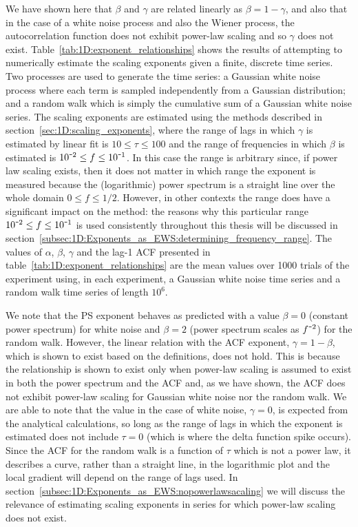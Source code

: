 {{We have shown here that $\beta$ and $\gamma$ are related linearly as $\beta = 1-\gamma$, and also that in the case of a white noise process and also the Wiener process, the autocorrelation function does not exhibit power-law scaling and so $\gamma$ does not exist. Table~\ref{tab:1D:exponent_relationships} shows the results of attempting to numerically estimate the scaling exponents given a finite, discrete time series. Two processes are used to generate the time series: a Gaussian white noise process where each term is sampled independently from a Gaussian distribution; and a random walk which is simply the cumulative sum of a Gaussian white noise series. The scaling exponents are estimated using the methods described in section~\ref{sec:1D:scaling_exponents}, where the range of lags in which $\gamma$ is estimated by linear fit is $10\leq\tau\leq100$ and the range of frequencies in which $\beta$ is estimated is $10^{\textup{\texttt{-}}2}\leq f \leq 10^{\textup{\texttt{-}}1}$. In this case the range is arbitrary since, if power law scaling exists, then it does not matter in which range the exponent is measured because the (logarithmic) power spectrum is a straight line over the whole domain $0\leq f \leq 1/2$. However, in other contexts the range does have a significant impact on the method: the reasons why this particular range $10^{\textup{\texttt{-}}2}\leq f \leq 10^{\textup{\texttt{-}}1}$ is used consistently throughout this thesis will be discussed in section~\ref{subsec:1D:Exponents_as_EWS:determining_frequency_range}. The values of $\alpha$, $\beta$, $\gamma$ and the lag-1 ACF presented in table~\ref{tab:1D:exponent_relationships} are the mean values over 1000 trials of the experiment using, in each experiment, a Gaussian white noise time series and a random walk time series of length $10^6$.

We note that the PS exponent behaves as predicted with a value $\beta=0$ (constant power spectrum) for white noise and $\beta=2$ (power spectrum scales as $f^{\textup{\texttt{-}} 2}$) for the random walk. However, the linear relation with the ACF exponent, $\gamma = 1-\beta$, which is shown to exist based on the definitions, does not hold. This is because the relationship is shown to exist only when power-law scaling is assumed to exist in both the power spectrum and the ACF and, as we have shown, the ACF does not exhibit power-law scaling for Gaussian white noise nor the random walk. We are able to note that the value in the case of white noise, $\gamma=0$, is expected from the analytical calculations, so long as the range of lags in which the exponent is estimated does not include $\tau=0$ (which is where the delta function spike occurs). Since the ACF for the random walk is a function of $\tau$ which is not a power law, it describes a curve, rather than a straight line, in the logarithmic plot and the local gradient will depend on the range of lags used. In section~\ref{subsec:1D:Exponents_as_EWS:nopowerlawsacaling} we will discuss the relevance of estimating scaling exponents in series for which power-law scaling does not exist. 

}}
